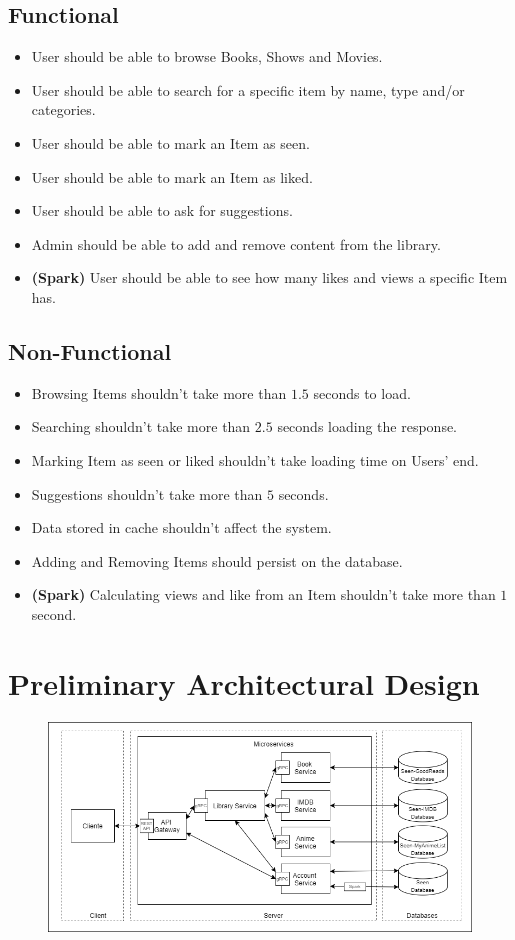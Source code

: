 \documentclass{article}
\begin{document}
  \subsection{Functional}
    \begin{itemize}
      \item User should be able to browse Books, Shows and Movies.
      \item User should be able to search for a specific item by name, type and/or categories.
      \item User should be able to mark an Item as seen.
      \item User should be able to mark an Item as liked.
      \item User should be able to ask for suggestions.
      \item Admin should be able to add and remove content from the library.
      \item \textbf{(Spark)} User should be able to see how many likes and views a specific Item has.
    \end{itemize}

  \subsection{Non-Functional}
    \begin{itemize}
      \item Browsing Items shouldn't take more than $1.5$ seconds to load.
      \item Searching shouldn't take more than $2.5$ seconds loading the response.
      \item Marking Item as seen or liked shouldn't take loading time on Users' end.
      \item Suggestions shouldn't take more than $5$ seconds.
      \item Data stored in cache shouldn't affect the system.
      \item Adding and Removing Items should persist on the database.
      \item \textbf{(Spark)} Calculating views and like from an Item shouldn't take more than $1$ second.
    \end{itemize}

\section{Preliminary Architectural Design}
  \begin{figure}[H]
    \centering
    \includegraphics[width=\textwidth]{"images/CloudNativeAppArchitecture.png"}
  \end{figure}
\end{document}
